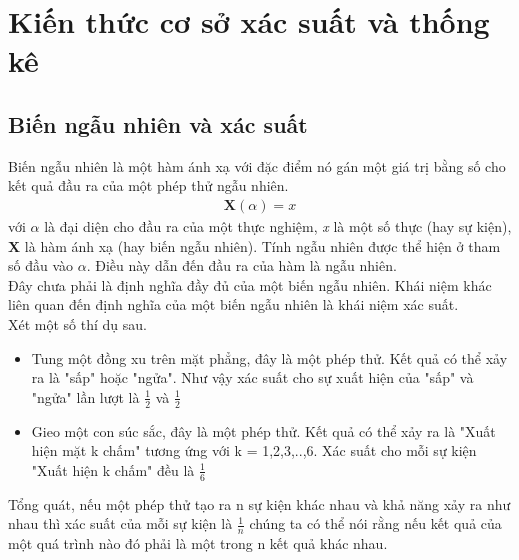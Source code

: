 \chapter{Kiến thức cơ sở xác suất và thống kê}\label{ch:1}
\section{Biến ngẫu nhiên và xác suất}\label{sec:1.1}
Biến ngẫu nhiên là một hàm ánh xạ với đặc điểm nó gán một giá trị bằng số cho kết quả đầu ra của một phép thử ngẫu nhiên.
\begin{align}
    \textbf{X}(\alpha)=\textit{x}
\end{align}
với $\alpha$ là đại diện cho đầu ra của một thực nghiệm, \textit{x} là một số thực (hay sự kiện), \textbf{X} là hàm ánh xạ (hay biến ngẫu nhiên).  
Tính ngẫu nhiên được thể hiện ở tham số đầu vào $\alpha$. Điều này dẫn đến đầu ra của hàm là ngẫu nhiên.\\
Đây chưa phải là định nghĩa đầy đủ của một biến ngẫu nhiên. Khái niệm khác liên quan đến định nghĩa của một biến ngẫu nhiên là khái niệm xác suất. \\
Xét một số thí dụ sau.
\begin{itemize}
    \item Tung một đồng xu trên mặt phẳng, đây là một phép thử. Kết quả có thể xảy ra là "sấp" hoặc "ngửa". Như vậy xác suất cho sự xuất hiện của "sấp" và "ngửa" lần lượt là 
	$ \frac{1}{2} $ và $ \frac{1}{2} $
    \item Gieo một con súc sắc, đây là một phép thử. Kết quả có thể xảy ra là "Xuất hiện mặt k chấm" tương ứng với k = 1,2,3,..,6. Xác suất cho mỗi sự kiện "Xuất hiện k chấm" đều là $ \frac{1}{6} $
\end{itemize}
Tổng quát, nếu một phép thử tạo ra n sự kiện khác nhau và khả năng xảy ra như nhau thì xác suất của mỗi sự kiện là $ \frac{1}{n} $
chúng ta có thể nói rằng nếu kết quả của một quá trình nào đó phải là một trong n kết quả khác nhau. 
\par


